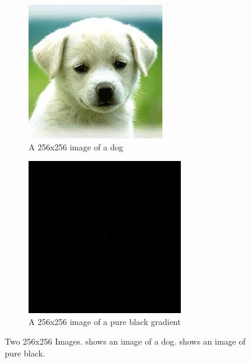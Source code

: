 \documentclass{l4proj}
\begin{document}
\begin{figure}[!h]
    \centering
    \begin{subfigure}[b]{0.4\textwidth}
        \includegraphics[width=\textwidth]{images/dog.jpg}
        \caption{A 256x256 image of a dog}
        \label{fig:dog_image}
    \end{subfigure}
    \begin{subfigure}[b]{0.4\textwidth}
        \includegraphics[width=\textwidth]{images/black_image.png}
        \caption{A 256x256 image of a pure black gradient}
        \label{fig:black_image}
    \end{subfigure}
    \caption{Two 256x256 Images.  shows an image of a dog.  shows an image of pure black.}
\end{figure}
\end{document}

